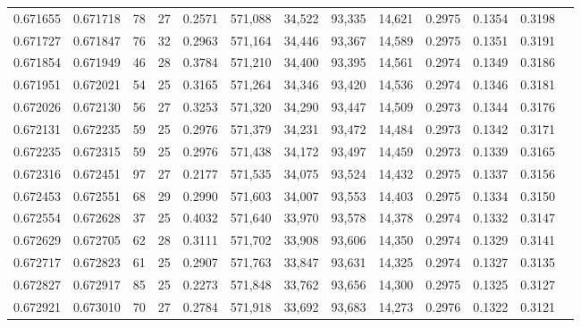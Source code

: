 \begin{tabular}{rrrrrrrrrrrrr}
0.671655 & 0.671718 &  78 &  27 &                                     0.2571 & 571,088 &  34,522 &  93,335 &  14,621 & 0.2975 & 0.1354 & 0.3198 \\
0.671727 & 0.671847 &  76 &  32 &                                     0.2963 & 571,164 &  34,446 &  93,367 &  14,589 & 0.2975 & 0.1351 & 0.3191 \\
0.671854 & 0.671949 &  46 &  28 &                                     0.3784 & 571,210 &  34,400 &  93,395 &  14,561 & 0.2974 & 0.1349 & 0.3186 \\
0.671951 & 0.672021 &  54 &  25 &                                     0.3165 & 571,264 &  34,346 &  93,420 &  14,536 & 0.2974 & 0.1346 & 0.3181 \\
0.672026 & 0.672130 &  56 &  27 &                                     0.3253 & 571,320 &  34,290 &  93,447 &  14,509 & 0.2973 & 0.1344 & 0.3176 \\
0.672131 & 0.672235 &  59 &  25 &                                     0.2976 & 571,379 &  34,231 &  93,472 &  14,484 & 0.2973 & 0.1342 & 0.3171 \\
0.672235 & 0.672315 &  59 &  25 &                                     0.2976 & 571,438 &  34,172 &  93,497 &  14,459 & 0.2973 & 0.1339 & 0.3165 \\
0.672316 & 0.672451 &  97 &  27 &                                     0.2177 & 571,535 &  34,075 &  93,524 &  14,432 & 0.2975 & 0.1337 & 0.3156 \\
0.672453 & 0.672551 &  68 &  29 &                                     0.2990 & 571,603 &  34,007 &  93,553 &  14,403 & 0.2975 & 0.1334 & 0.3150 \\
0.672554 & 0.672628 &  37 &  25 &                                     0.4032 & 571,640 &  33,970 &  93,578 &  14,378 & 0.2974 & 0.1332 & 0.3147 \\
0.672629 & 0.672705 &  62 &  28 &                                     0.3111 & 571,702 &  33,908 &  93,606 &  14,350 & 0.2974 & 0.1329 & 0.3141 \\
0.672717 & 0.672823 &  61 &  25 &                                     0.2907 & 571,763 &  33,847 &  93,631 &  14,325 & 0.2974 & 0.1327 & 0.3135 \\
0.672827 & 0.672917 &  85 &  25 &                                     0.2273 & 571,848 &  33,762 &  93,656 &  14,300 & 0.2975 & 0.1325 & 0.3127 \\
0.672921 & 0.673010 &  70 &  27 &                                     0.2784 & 571,918 &  33,692 &  93,683 &  14,273 & 0.2976 & 0.1322 & 0.3121 \\

\end{tabular}
